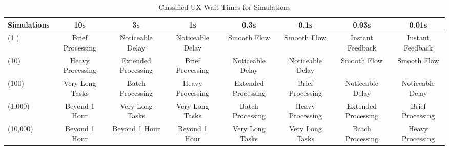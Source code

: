 \documentclass{article}
\begin{document}
\begin{landscape}
\begin{table}[h!]
    \centering
    \begin{tabular}{|l|c|c|c|c|c|c|c|}
    \hline
    \textbf{Simulations} & \textbf{10s} & \textbf{3s} & \textbf{1s} & \textbf{0.3s} & \textbf{0.1s} & \textbf{0.03s} & \textbf{0.01s} \\ \hline
    (1 ) & Brief Processing & Noticeable Delay & Noticeable Delay & Smooth Flow & Smooth Flow & Instant Feedback & Instant Feedback \\ \hline
    (10) & Heavy Processing & Extended Processing & Brief Processing & Noticeable Delay & Noticeable Delay & Smooth Flow & Smooth Flow \\ \hline
    (100) & Very Long Tasks & Batch Processing & Heavy Processing & Extended Processing & Brief Processing & Noticeable Delay & Noticeable Delay \\ \hline
    (1,000) & Beyond 1 Hour & Very Long Tasks & Very Long Tasks & Batch Processing & Heavy Processing & Extended Processing & Brief Processing \\ \hline
    (10,000) & Beyond 1 Hour & Beyond 1 Hour & Beyond 1 Hour & Very Long Tasks & Very Long Tasks & Batch Processing & Heavy Processing \\ \hline
    \end{tabular}
    \caption{Classified UX Wait Times for Simulations}
\end{table}


\end{landscape}
\end{document}
